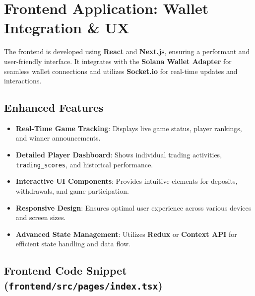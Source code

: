 \documentclass[11pt,a4paper]{article}
\begin{document}
\section{Frontend Application: Wallet Integration \& UX}

The frontend is developed using \textbf{React} and \textbf{Next.js}, ensuring a performant and user-friendly interface. It integrates with the \textbf{Solana Wallet Adapter} for seamless wallet connections and utilizes \textbf{Socket.io} for real-time updates and interactions.

\subsection{Enhanced Features}

\begin{itemize}
    \item \textbf{Real-Time Game Tracking}: Displays live game status, player rankings, and winner announcements.
    \item \textbf{Detailed Player Dashboard}: Shows individual trading activities, \texttt{trading\_scores}, and historical performance.
    \item \textbf{Interactive UI Components}: Provides intuitive elements for deposits, withdrawals, and game participation.
    \item \textbf{Responsive Design}: Ensures optimal user experience across various devices and screen sizes.
    \item \textbf{Advanced State Management}: Utilizes \textbf{Redux} or \textbf{Context API} for efficient state handling and data flow.
\end{itemize}

\subsection{Frontend Code Snippet (\texttt{frontend/src/pages/index.tsx})}
\end{document}
